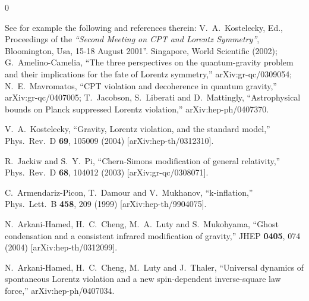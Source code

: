 \documentclass[aps]{ws-procs9x6}
\begin{document}
\begin{thebibliography}{0}

See for example the following and references
therein:
V.~A.~Kostelecky, Ed., Proceedings of the {\em ``Second Meeting on
CPT and Lorentz Symmetry''}, Bloomington, Usa, 15-18 August
2001''. Singapore, World Scientific (2002);
G.~Amelino-Camelia,
 ``The three perspectives on the quantum-gravity problem and their implications
for the fate of Lorentz symmetry,''
arXiv:gr-qc/0309054;
N.~E.~Mavromatos,
``CPT violation and decoherence in quantum gravity,''
arXiv:gr-qc/0407005;
%
T.~Jacobson, S.~Liberati and D.~Mattingly,
``Astrophysical bounds on Planck suppressed Lorentz violation,''
arXiv:hep-ph/0407370.

V.~A.~Kostelecky,
``Gravity, Lorentz violation, and the standard model,''
Phys.\ Rev.\ D {\bf 69}, 105009 (2004)
[arXiv:hep-th/0312310].

R.~Jackiw and S.~Y.~Pi,
``Chern-Simons modification of general relativity,''
Phys.\ Rev.\ D {\bf 68}, 104012 (2003)
[arXiv:gr-qc/0308071].

C.~Armendariz-Picon, T.~Damour and V.~Mukhanov,
``k-inflation,''
Phys.\ Lett.\ B {\bf 458}, 209 (1999)
[arXiv:hep-th/9904075].

N.~Arkani-Hamed, H.~C.~Cheng, M.~A.~Luty and S.~Mukohyama,
``Ghost condensation and a consistent infrared modification of gravity,''
JHEP {\bf 0405}, 074 (2004)
[arXiv:hep-th/0312099].

N.~Arkani-Hamed, H.~C.~Cheng, M.~Luty and J.~Thaler,
``Universal dynamics of spontaneous Lorentz violation and a new spin-dependent
inverse-square law force,''
arXiv:hep-ph/0407034.


\end{thebibliography}
\end{document}
